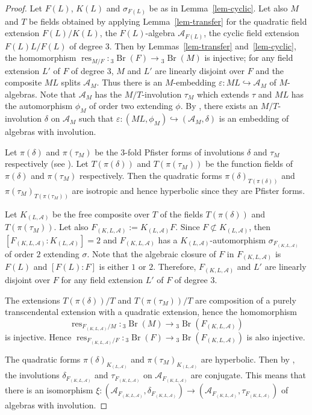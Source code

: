 \documentclass[10pt]{article}
\theoremstyle{definition}
\DeclareMathOperator{\Br}{Br}
\DeclareMathOperator{\res}{res}
\newcommand{\A}{\mathcal A}
\newcommand{\Fk}{F_{(K,L,\A)}}
\newcommand{\Kl}{K_{(L,\A)}}
\newcommand{\bthree}[1]{{}_3\Br(#1)}
\newcommand{\sourcepage}[1]{\label{source-page-#1}}
\begin{document}
\begin{proof}
Let $F(L)$, $K(L)$ and $\sigma_{F(L)}$ be as in Lemma~\ref{lem-cyclic}. Let also $M$ and $T$ be fields obtained by applying Lemma~\ref{lem-transfer} for the quadratic field extension $F(L)/K(L)$, the $F(L)$-algebra $\A_{F(L)}$, the cyclic field extension $F(L)L/F(L)$ of degree $3$. Then by Lemmas~\ref{lem-transfer} and~\ref{lem-cyclic}, the homomorphism $\res_{M/F}:\bthree F\to\bthree M$ is injective; for any field extension $L'$ of $F$ of degree $3$, $M$ and $L'$ are linearly disjoint over $F$ and the composite $ML$ splits $\A_M$. Thus there is an $M$-embedding $\varepsilon:ML\hookrightarrow\A_M$ of $M$-algebras.
\newpage
\sourcepage{6}
Note that $\A_M$ has the $M/T$-involution $\tau_M$ which extends $\tau$ and $ML$ has the automorphism $\phi_M$ of order two extending $\phi$. By \cite[Proposition 3.1]{r5}, there exists an $M/T$-involution $\delta$ on $\A_M$ such that $\varepsilon:(ML,\phi_M)\hookrightarrow(\A_M,\delta)$ is an embedding of algebras with involution.

Let $\pi(\delta)$ and $\pi(\tau_M)$ be the $3$-fold Pfister forms of involutions $\delta$ and $\tau_M$ respectively (see \cite[\S19.B]{r3}). Let $T(\pi(\delta))$ and $T(\pi(\tau_M))$ be the function fields of $\pi(\delta)$ and $\pi(\tau_M)$ respectively. Then the quadratic forms $\pi(\delta)_{T(\pi(\delta))}$ and $\pi(\tau_M)_{T(\pi(\tau_M))}$ are isotropic and hence hyperbolic since they are Pfister forms.

Let $\Kl$ be the free composite over $T$ of the fields $T(\pi(\delta))$ and $T(\pi(\tau_M))$. Let also $\Fk:=\Kl F$. Since $F\not\subset\Kl$, then $[\Fk:\Kl]=2$ and $\Fk$ has a $\Kl$-automorphism $\sigma_{\Fk}$ of order $2$ extending $\sigma$. Note that the algebraic closure of $F$ in $\Fk$ is $F(L)$ and $[F(L):F]$ is either $1$ or $2$. Therefore, $\Fk$ and $L'$ are linearly disjoint over $F$ for any field extension $L'$ of $F$ of degree $3$.

The extensions $T(\pi(\delta))/T$ and $T(\pi(\tau_M))/T$ are composition of a purely transcendental extension with a quadratic extension, hence the homomorphism
\[
\res_{\Fk/M}:\bthree M\longrightarrow\bthree{\Fk}
\]
is injective. Hence $\res_{\Fk/F}:\bthree F\to\bthree{\Fk}$ is also injective.

The quadratic forms $\pi(\delta)_{\Kl}$ and $\pi(\tau_M)_{\Kl}$ are hyperbolic. Then by \cite[Th. 19.6]{r3}, the involutions $\delta_{\Fk}$ and $\tau_{\Fk}$ on $\A_{\Fk}$ are conjugate. This means that there is an isomorphism $\xi:(\A_{\Fk},\delta_{\Fk})\to(\A_{\Fk},\tau_{\Fk})$ of algebras with involution.


\end{proof}
\end{document}
